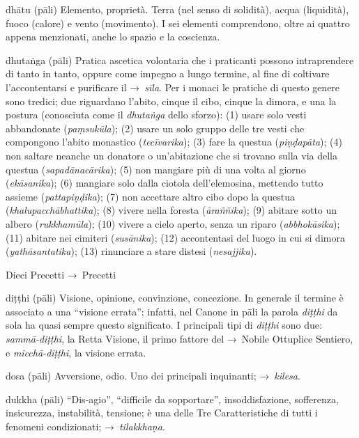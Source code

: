 \begin{glossarydescription}
\item[dhātu] (pāli) Elemento, proprietà. Terra (nel senso di solidità), acqua
  (liquidità), fuoco (calore) e vento (movimento). I sei elementi comprendono,
  oltre ai quattro appena menzionati, anche lo spazio e la coscienza.

\item[dhutaṅga] (pāli)\label{glossary-dhutanga} Pratica ascetica volontaria che i praticanti possono
  intraprendere di tanto in tanto, oppure come impegno a lungo termine, al fine
  di coltivare l'accontentarsi e purificare il →~\emph{sīla}. Per i monaci le
  pratiche di questo genere sono tredici; due riguardano l'abito, cinque il
  cibo, cinque la dimora, e una la postura (conosciuta come il \emph{dhutaṅga}
  dello sforzo): (1) usare solo vesti abbandonate (\emph{paṃsukūla}); (2) usare
  un solo gruppo delle tre vesti che compongono l'abito monastico
  (\emph{tecīvarika}); (3) fare la questua (\emph{piṇḍapāta}); (4) non saltare
  neanche un donatore o un'abitazione che si trovano sulla via della questua
  (\emph{sapadānacārika}); (5) non mangiare più di una volta al giorno
  (\emph{ekāsanika}); (6) mangiare solo dalla ciotola dell'elemosina, mettendo
  tutto assieme (\emph{pattapiṇḍika}); (7) non accettare altro cibo dopo la
  questua (\emph{khalupacchābhattika}); (8) vivere nella foresta
  (\emph{āraññika}); (9) abitare sotto un albero (\emph{rukkhamūla}); (10)
  vivere a cielo aperto, senza un riparo (\emph{abbhokāsika}); (11) abitare nei
  cimiteri (\emph{susānika}); (12) accontentasi del luogo in cui si dimora
  (\emph{yathāsantatika}); (13) rinunciare a stare distesi (\emph{nesajjika}).

\item[Dieci Precetti] →~Precetti

\item[diṭṭhi] (pāli) Visione, opinione, convinzione, concezione. In generale il
  termine è associato a una ``visione errata''; infatti, nel Canone in pāli la
  parola \emph{diṭṭhi} da sola ha quasi sempre questo significato. I principali
  tipi di \emph{diṭṭhi} sono due: \emph{sammā-diṭṭhi}, la Retta Visione, il
  primo fattore del →~Nobile Ottuplice Sentiero, e \emph{micchā-diṭṭhi}, la
  visione errata.

\item[dosa] (pāli) Avversione, odio. Uno dei principali inquinanti;
  →~\emph{kilesa}.

\item[dukkha] (pāli) ``Dis-agio'', ``difficile da sopportare'', insoddisfazione,
  sofferenza, insicurezza, instabilità, tensione; è una delle Tre
  Caratteristiche di tutti i fenomeni condizionati; →~\emph{tilakkhaṇa}.


\end{glossarydescription}
